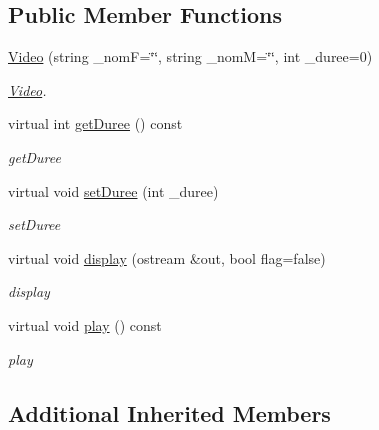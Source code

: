 \subsection*{Public Member Functions}
\begin{DoxyCompactItemize}
\item 
\hyperlink{classVideo_ae9c2fb1a73fb2882941f6d65100f5fc4}{Video} (string \+\_\+nom\+F=\char`\"{}\char`\"{}, string \+\_\+nom\+M=\char`\"{}\char`\"{}, int \+\_\+duree=0)
\begin{DoxyCompactList}\small\item\em \hyperlink{classVideo}{Video}. \end{DoxyCompactList}\item 
virtual int \hyperlink{classVideo_a481a3fe9717c76c2d012498c7a1b08ca}{get\+Duree} () const 
\begin{DoxyCompactList}\small\item\em get\+Duree \end{DoxyCompactList}\item 
virtual void \hyperlink{classVideo_a713899ce1fcf112a04ea18f917a60fa2}{set\+Duree} (int \+\_\+duree)
\begin{DoxyCompactList}\small\item\em set\+Duree \end{DoxyCompactList}\item 
virtual void \hyperlink{classVideo_a2f1902c8131fc232926e34487b54e0b9}{display} (ostream \&out, bool flag=false)
\begin{DoxyCompactList}\small\item\em display \end{DoxyCompactList}\item 
virtual void \hyperlink{classVideo_acb8fdb5186d3b35672b9218375cf4f0b}{play} () const 
\begin{DoxyCompactList}\small\item\em play \end{DoxyCompactList}\end{DoxyCompactItemize}
\subsection*{Additional Inherited Members}



